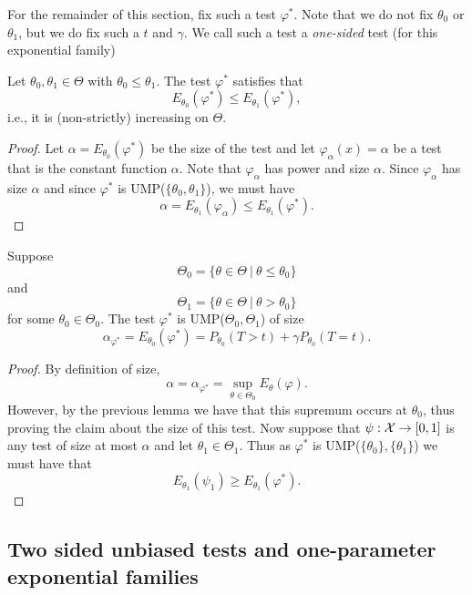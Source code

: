 \documentclass[twoside, a4paper, 10pt]{amsart}
\begin{document}
For the remainder of this section, fix such a test $\varphi^*$. Note that we do not fix $\theta_0$ or $\theta_1$, but we do fix such a $t$ and $\gamma$. We call such a test a \textit{one-sided} test (for this exponential family)

\begin{lemma}\label{lemma: one-sided test is unbiased} Let $\theta_0, \theta_1 \in \Theta$ with $\theta_0 \leq \theta_1$. The test $\varphi^*$ satisfies that $$E_{\theta_0}(\varphi^*) \leq E_{\theta_1}(\varphi^*),$$ i.e., it is (non-strictly) increasing on $\Theta$.

\end{lemma}

\begin{proof} Let $\alpha = E_{\theta_0}(\varphi^*)$ be the size of the test and let $\varphi_{\alpha}(x) = \alpha$ be a test that is the constant function $\alpha$. Note that $\varphi_{\alpha}$ has power and size $\alpha$. Since $\varphi_{\alpha}$ has size $\alpha$ and since $\varphi^*$ is UMP($\{\theta_0, \theta_1\}$), we must have $$\alpha = E_{\theta_1}(\varphi_{\alpha}) \leq E_{\theta_1}(\varphi^*).$$

\end{proof}

\begin{thm} Suppose $$\Theta_0 = \{\theta \in \Theta ~|~ \theta \leq \theta_0\}$$ and $$\Theta_1 = \{\theta \in \Theta ~|~ \theta > \theta_0 \}$$ for some $\theta_0 \in \Theta_0$. 
The test $\varphi^*$ is UMP($\Theta_0, \Theta_1$) of size $$\alpha_{\varphi^*} = E_{\theta_0}(\varphi^*) = P_{\theta_0}(T > t) + \gamma P_{\theta_0}(T = t). $$

\end{thm}

\begin{proof} By definition of size, $$\alpha = \alpha_{\varphi^*} = \sup_{\theta \in \Theta_0} E_{\theta}(\varphi).$$ However, by the previous lemma we have that this supremum occurs at $\theta_0$, thus proving the claim about the size of this test. Now suppose that $\psi:\mathcal{X} \to [0,1]$ is any test of size at most $\alpha$ and let $\theta_1 \in \Theta_1$. Thus as $\varphi^*$ is UMP($\{\theta_0\}, \{\theta_1\}$) we must have that $$E_{\theta_1}(\psi_1) \geq E_{\theta_1}(\varphi^*).$$ \end{proof}

\subsection{Two sided unbiased tests and one-parameter exponential families}
\end{document}
